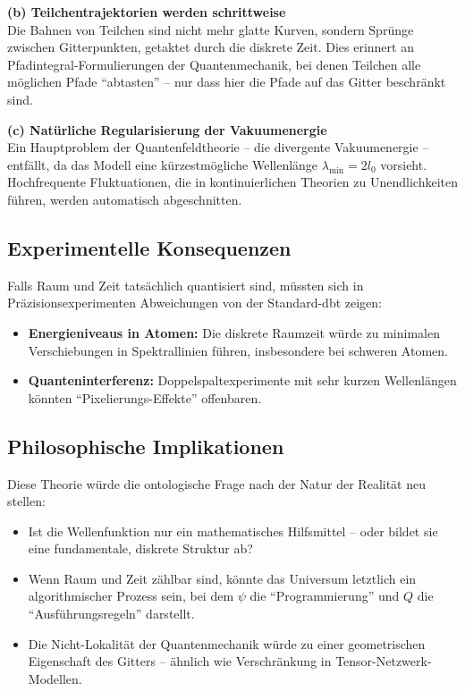 \textbf{(b) Teilchentrajektorien werden schrittweise}\\
Die Bahnen von Teilchen sind nicht mehr glatte Kurven, sondern Sprünge zwischen Gitterpunkten, getaktet durch die diskrete Zeit. Dies erinnert an Pfadintegral-Formulierungen der
Quantenmechanik, bei denen Teilchen alle möglichen Pfade \enquote{abtasten} – nur dass hier die Pfade auf das Gitter beschränkt sind.

\textbf{(c) Natürliche Regularisierung der Vakuumenergie}\\
Ein Hauptproblem der Quantenfeldtheorie – die divergente Vakuumenergie – entfällt, da das Modell eine kürzestmögliche Wellenlänge $\lambda_\text{min} = 2l_0$ vorsieht. Hochfrequente Fluktuationen,
die in kontinuierlichen Theorien zu Unendlichkeiten führen, werden automatisch abgeschnitten.

\subsection{Experimentelle Konsequenzen}
Falls Raum und Zeit tatsächlich quantisiert sind, müssten sich in Präzisionsexperimenten Abweichungen von der Standard-\gls{dbt} zeigen:

\begin{itemize}
    \item \textbf{Energieniveaus in Atomen:} Die diskrete Raumzeit würde zu minimalen Verschiebungen in Spektrallinien führen, insbesondere bei schweren Atomen.
    \item \textbf{Quanteninterferenz:} Doppelspaltexperimente mit sehr kurzen Wellenlängen könnten \enquote{Pixelierungs-Effekte} offenbaren.
\end{itemize}

\subsection{Philosophische Implikationen}
Diese Theorie würde die ontologische Frage nach der Natur der Realität neu stellen:
\begin{itemize}
    \item Ist die Wellenfunktion nur ein mathematisches Hilfsmittel – oder bildet sie eine fundamentale, diskrete Struktur ab?
    \item Wenn Raum und Zeit zählbar sind, könnte das Universum letztlich ein algorithmischer Prozess sein, bei dem $\psi$ die \enquote{Programmierung} und $Q$ die \enquote{Ausführungsregeln} darstellt.
    \item Die Nicht-Lokalität der Quantenmechanik würde zu einer geometrischen Eigenschaft des Gitters – ähnlich wie Verschränkung in Tensor-Netzwerk-Modellen.
\end{itemize}

